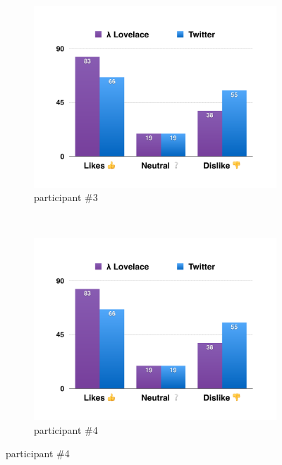 \documentclass{article}
\begin{document}
\begin{figure}
    \vspace{2em}
    
    \begin{subfigure}[b]{0.48\textwidth}
        \includegraphics[page=3,width=\textwidth]{evaluation_charts}
        \caption{participant \#3}
        \label{fig:participant3}
    \end{subfigure}
    ~
    \begin{subfigure}[b]{0.48\textwidth}
        \includegraphics[page=4,width=\textwidth]{evaluation_charts}
        \caption{participant \#4}
        \label{fig:participant4}
    \end{subfigure}
    
    \vspace{2em}
    

\end{figure}
\end{document}
